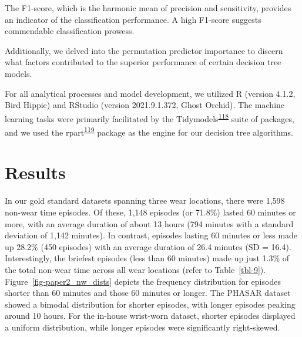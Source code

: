 \documentclass[
  9pt,
]{scrbook}
\begin{document}
The F1-score, which is the harmonic mean of precision and sensitivity,
provides an indicator of the classification performance. A high F1-score
suggests commendable classification prowess.

Additionally, we delved into the permutation predictor importance to
discern what factors contributed to the superior performance of certain
decision tree models.

For all analytical processes and model development, we utilized R
(version 4.1.2, Bird Hippie) and RStudio (version 2021.9.1.372, Ghost
Orchid). The machine learning tasks were primarily facilitated by the
Tidymodels\textsuperscript{\protect\hyperlink{ref-kuhn_tidymodels_2020}{118}}
suite of packages, and we used the
rpart\textsuperscript{\protect\hyperlink{ref-rpart}{119}} package as the
engine for our decision tree algorithms.

\hypertarget{results-1}{%
\section{Results}\label{results-1}}

In our gold standard datasets spanning three wear locations, there were
1,598 non-wear time episodes. Of these, 1,148 episodes (or 71.8\%)
lasted 60 minutes or more, with an average duration of about 13 hours
(794 minutes with a standard deviation of 1,142 minutes). In contrast,
episodes lasting 60 minutes or less made up 28.2\% (450 episodes) with
an average duration of 26.4 minutes (SD = 16.4). Interestingly, the
briefest episodes (less than 60 minutes) made up just 1.3\% of the total
non-wear time across all wear locations (refer to Table~\ref{tbl-9}).
Figure~\ref{fig-paper2_nw_dists} depicts the frequency distribution for
episodes shorter than 60 minutes and those 60 minutes or longer. The
PHASAR dataset showed a bimodal distribution for shorter episodes, with
longer episodes peaking around 10 hours. For the in-house wrist-worn
dataset, shorter episodes displayed a uniform distribution, while longer
episodes were significantly right-skewed.

\begingroup

\footnotesize
\end{document}
